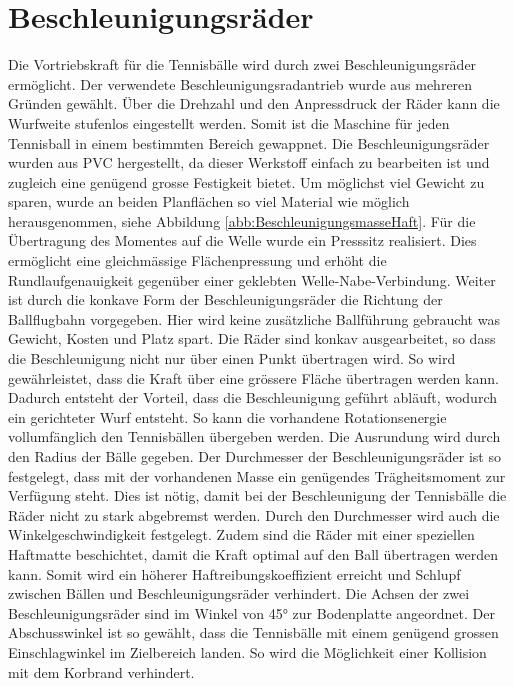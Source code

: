\section{Beschleunigungsräder}
    Die Vortriebskraft für die Tennisbälle wird durch zwei Beschleunigungsräder ermöglicht. Der verwendete
    Beschleunigungsradantrieb wurde aus mehreren Gründen gewählt. Über die Drehzahl und den 
    Anpressdruck der Räder kann die Wurfweite stufenlos eingestellt werden. Somit ist die Maschine 
    für jeden Tennisball in einem bestimmten Bereich gewappnet. Die Beschleunigungsräder wurden 
    aus PVC hergestellt, da dieser Werkstoff einfach zu bearbeiten ist und zugleich eine genügend 
    grosse Festigkeit bietet. Um möglichst viel Gewicht zu sparen, wurde an beiden Planflächen so 
    viel Material wie möglich herausgenommen, siehe Abbildung \ref{abb:BeschleunigungsmasseHaft}. 
    Für die Übertragung des Momentes auf die Welle wurde 
    ein Presssitz realisiert. Dies ermöglicht eine gleichmässige Flächenpressung und erhöht die 
    Rundlaufgenauigkeit gegenüber einer geklebten Welle-Nabe-Verbindung. Weiter ist durch die konkave Form der 
    Beschleunigungsräder die Richtung der Ballflugbahn vorgegeben. Hier wird keine zusätzliche Ballführung 
    gebraucht was Gewicht, Kosten und Platz spart. Die Räder sind konkav ausgearbeitet, so dass die 
    Beschleunigung nicht nur über einen Punkt übertragen wird. So wird gewährleistet, dass die Kraft 
    über eine grössere Fläche übertragen werden kann. Dadurch entsteht der Vorteil, dass die 
    Beschleunigung geführt abläuft, wodurch ein gerichteter Wurf entsteht. So kann die vorhandene 
    Rotationsenergie vollumfänglich den Tennisbällen übergeben werden. Die Ausrundung wird durch 
    den Radius der Bälle gegeben. Der Durchmesser der Beschleunigungsräder ist so festgelegt, dass 
    mit der vorhandenen Masse ein genügendes Trägheitsmoment zur Verfügung steht. Dies ist nötig, 
    damit bei der Beschleunigung der Tennisbälle die Räder nicht zu stark abgebremst werden. Durch 
    den Durchmesser wird auch die Winkelgeschwindigkeit festgelegt. Zudem sind die Räder mit einer 
    speziellen Haftmatte beschichtet, damit die 
    Kraft optimal auf den Ball übertragen werden kann. Somit wird ein höherer Haftreibungskoeffizient 
    erreicht und Schlupf zwischen Bällen und Beschleunigungsräder verhindert. Die Achsen der zwei Beschleunigungsräder sind im 
    Winkel von 45\si{\degree} zur Bodenplatte angeordnet. Der Abschusswinkel ist so gewählt, dass 
    die Tennisbälle mit einem genügend grossen Einschlagwinkel im Zielbereich landen. So wird die Möglichkeit einer Kollision mit dem Korbrand verhindert.
